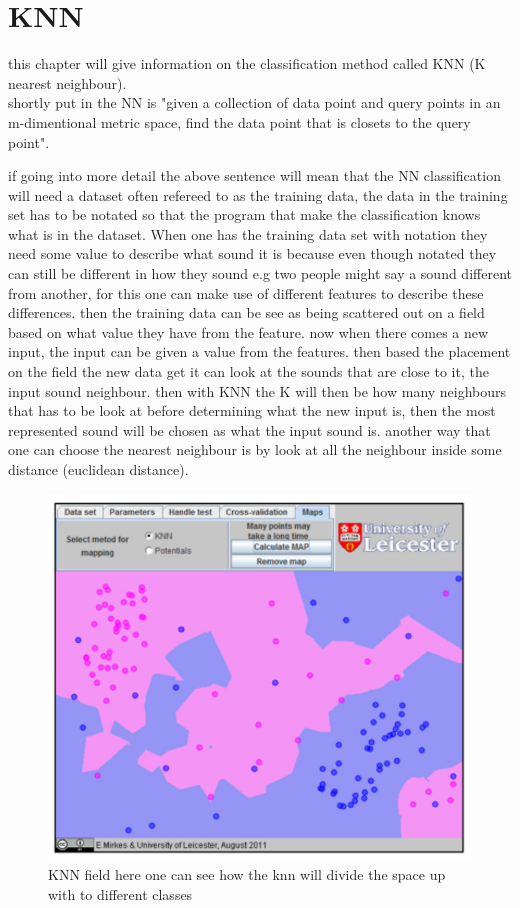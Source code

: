 \section{KNN}
this chapter will give information on the classification method called KNN (K nearest neighbour).\\
shortly put in \citep{meaningfulNN} the NN is "given a collection of data point and query points in an m-dimentional metric space, find the data point that is closets to the query point".

if going into more detail the above sentence will mean that the NN classification will need a dataset often refereed to as the training data, the data in the training set has to be notated so that the program that make the classification knows what is in the dataset. When one has the training data set with notation they need some value to describe what sound it is  because even though notated they can still be different in how they sound e.g two people might say a sound different from another, for this one can make use of different features to describe these differences. then the training data can be see as being scattered out on a field based on what value they have from the feature. now when there comes a new input, the input can be given a value from the features. then based the placement on the field the new data get it can look at the sounds that are close to it, the input sound neighbour. then with KNN the K will then be how many neighbours that has to be look at before determining what the new input is, then the most represented sound will be chosen as what the input sound is. another way that one can choose the nearest neighbour is by look at all the neighbour inside some distance (euclidean distance)\citep{NNHD}.
\begin{figure}[h]
	\begin{center}
		\includegraphics[scale = 0.5]{fig/KNNfig.jpg}
		\caption{KNN field here one can see how the knn will divide the space up with to different classes \citep{introKNN}}
		\label{KNN fig}
	\end{center}
\end{figure}
